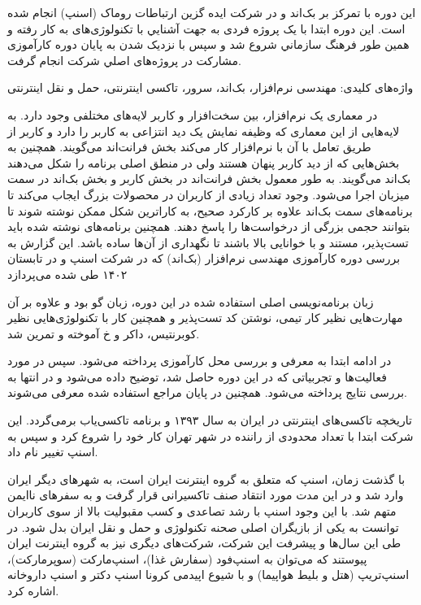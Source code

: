 \documentclass[a4]{report}
\begin{document}
این دوره با تمرکز بر بک‌اند و در شرکت ایده گزین ارتباطات روماک (اسنپ) انجام شده است.
این دوره ابتدا با یک پروژه فردی به جهت آشنایي با تکنولوژی‌های به کار رفته و همین طور فرهنگ
سازماني شروع شد و سپس با نزدیک شدن به پایان دوره کارآموزی مشارکت در پروژه‌های اصلي شرکت انجام گرفت.

واژه‌های کلیدی: مهندسی نرم‌افزار، بک‌اند، سرور، تاکسی اینترنتی، حمل و نقل اینترنتی

در معماری یک نرم‌افزار، بین سخت‌افزار و کاربر لایه‌های مختلفی وجود دارد. به لایه‌هایی از این معماری که
وظیفه نمایش یک دید انتزاعی به کاربر را دارد و کاربر از طریق تعامل با آن با نرم‌افزار کار می‌کند بخش فرانت‌اند
می‌گویند. همچنین به بخش‌هایی که از دید کاربر پنهان هستند ولی در منطق اصلی برنامه را شکل می‌دهند بک‌اند
می‌گویند. به طور معمول بخش فرانت‌اند در بخش کاربر و بخش بک‌اند در سمت میزبان اجرا می‌شود.
 وجود تعداد زیادی از کاربران در محصولات بزرگ ایجاب می‌کند تا برنامه‌های سمت بک‌اند علاوه بر کارکرد
صحیح، به کارا‌ترین شکل ممکن نوشته شوند تا بتوانند حجمی بزرگی از درخواست‌ها را پاسخ دهند. همچنین
برنامه‌های نوشته شده باید تست‌پذیر، مستند و با خوانایی بالا باشند تا نگهداری از آن‌ها ساده باشد.
این گزارش به بررسی دوره کارآموزی مهندسی نرم‌افزار (بک‌اند) که در شرکت اسنپ و در تابستان ۱۴۰۲ طی شده می‌پردازد

زبان برنامه‌نویسی اصلی استفاده شده در این دوره، زبان گو بود و علاوه بر آن مهارت‌هایی نظیر کار تیمی، نوشتن کد تست‌پذیر و همچنین کار با تکنولوژی‌هایی نظیر کوبرنتیس، داکر و ‌خ آموخته و تمرین شد.

در ادامه ابتدا به معرفی و بررسی محل کارآموزی پرداخته می‌شود. سپس در مورد فعالیت‌ها و تجربیاتی که
در این دوره حاصل شد، توضیح داده می‌شود و در انتها به بررسی نتایج پرداخته می‌شود. همچنین در پایان
مراجع استفاده شده معرفی می‌شوند.

تاریخچه تاکسی‌های اینترنتی در ایران به سال ۱۳۹۳ و برنامه تاکسی‌یاب برمی‌گردد. این شرکت ابتدا با
تعداد محدودی از راننده در شهر تهران کار خود را شروع کرد و سپس به اسنپ تغییر نام داد.

با گذشت زمان، اسنپ که متعلق به گروه اینترنت ایران است، به شهرهای دیگر ایران وارد شد و در این مدت مورد انتقاد صنف تاکسیرانی
قرار گرفت و به سفرهای ناایمن متهم شد. با این وجود اسنپ با رشد تصاعدی و کسب مقبولیت
بالا از سوی کاربران توانست به یکی از بازیگران اصلی صحنه تکنولوژی و حمل و نقل ایران بدل شود. در طی این
سال‌ها و پیشرفت این شرکت، شرکت‌های دیگری نیز به گروه اینترنت ایران پیوستند که می‌توان به
اسنپ‌فود (سفارش غذا)، اسنپ‌مارکت (سوپرمارکت)، اسنپ‌تریپ (هتل و بلیط هواپیما) و با شیوع اپیدمی کرونا اسنپ دکتر و اسنپ داروخانه اشاره کرد.
\end{document}
